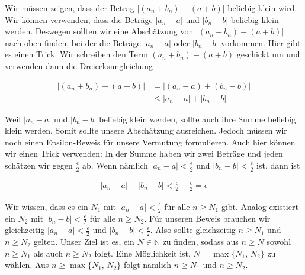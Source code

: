 \documentclass[fontsize=9pt,
               parskip=half-,
               DIV=14,
               listof=chapterentry,
               tocflat]{scrbook}
\begin{document}
\begin{solutionprocess*}
Wir müssen zeigen, dass der Betrag $|(a_{n}+b_{n})-(a+b)|$ beliebig klein wird. Wir können verwenden, dass die Beträge $|a_{n}-a|$ und $|b_{n}-b|$ beliebig klein werden. Deswegen sollten wir eine Abschätzung von $|(a_{n}+b_{n})-(a+b)|$ nach oben finden, bei der die Beträge $|a_{n}-a|$ oder $|b_{n}-b|$ vorkommen. Hier gibt es einen Trick: Wir schreiben den Term $(a_{n}+b_{n})-(a+b)$ geschickt um und verwenden dann die Dreiecksungleichung

\begin{align*}
|(a_{n}+b_{n})-(a+b)|&=|(a_{n}-a)+(b_{n}-b)|\\&\leq |a_{n}-a|+|b_{n}-b|
\end{align*}

Weil $|a_{n}-a|$ und $|b_{n}-b|$ beliebig klein werden, sollte auch ihre Summe beliebig klein werden. Somit sollte unsere Abschätzung ausreichen. Jedoch müssen wir noch einen Epsilon-Beweis für unsere Vermutung formulieren. Auch hier können wir einen Trick verwenden: In der Summe haben wir zwei Beträge und jeden schätzen wir gegen ${\tfrac {\epsilon }{2}}$ ab. Wenn nämlich $|a_{n}-a|<{\tfrac {\epsilon }{2}}$ und $|b_{n}-b|<{\tfrac {\epsilon }{2}}$ ist, dann ist

\begin{align*}
|a_{n}-a|+|b_{n}-b|<{\tfrac {\epsilon }{2}}+{\tfrac {\epsilon }{2}}=\epsilon 
\end{align*}

Wir wissen, dass es ein $N_{1}$ mit $|a_{n}-a|<{\tfrac {\epsilon }{2}}$ für alle $n\geq N_{1}$ gibt. Analog existiert ein $N_{2}$ mit $|b_{n}-b|<{\tfrac {\epsilon }{2}}$ für alle $n\geq N_{2}$. Für unseren Beweis brauchen wir gleichzeitig $|a_{n}-a|<{\tfrac {\epsilon }{2}}$ und $|b_{n}-b|<{\tfrac {\epsilon }{2}}$. Also sollte gleichzeitig $n\geq N_{1}$ und $n\geq N_{2}$ gelten. Unser Ziel ist es, ein $N\in \mathbb {N} $ zu finden, sodass aus $n\geq N$ sowohl $n\geq N_{1}$ als auch $n\geq N_{2}$ folgt. Eine Möglichkeit ist, $N=\max\{N_{1},\,N_{2}\}$ zu wählen. Aus $n\geq \max\{N_{1},\,N_{2}\}$ folgt nämlich $n\geq N_{1}$ und $n\geq N_{2}$.

\end{solutionprocess*}
\end{document}
